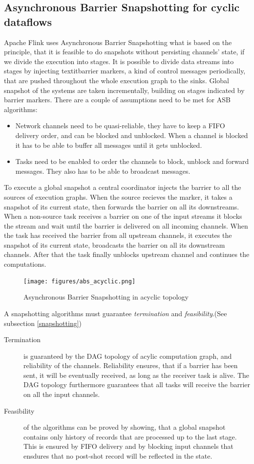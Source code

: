\subsection{Asynchronous Barrier Snapshotting for cyclic dataflows}
Apache Flink uses Asynchronous Barrier Snapshotting what is based on the principle, that it is feasible to do snapshots without persisting channels' state, if we divide the execution into stages. 
It is possible to divide data streams into stages by injecting textit{barrier markers}, a kind of control messages periodically, that are pushed throughout the whole execution graph to the sinks. Global snapshot of the systems are taken incrementally, building on stages indicated by barrier markers. There are a couple of assumptions need to be met for ASB algorithms:
\begin{itemize}
\item Network channels need to be quasi-reliable, they have to keep a FIFO delivery order, and can be blocked and unblocked. When a channel is blocked it has to be able to buffer all messages until it gets unblocked.
\item Tasks need to be enabled to order the channels to block, unblock and forward messages. They also has to be able to broadcast messages.
\end{itemize}
To execute a global snapshot a central coordinator injects the barrier to all the sources of execution graphs. When the source recieves the marker, it takes  a snapshot of its current state, then forwards the barrier on all its downstreams.  When a non-source task receives a barrier on one of the input streams it blocks the stream and wait until the barrier is delivered on all incoming channels. When the task has received the barrier from all upstream channels, it executes the snapshot of its current state, broadcasts the barrier on all its downstream channels. After that the task finally unblocks upstream channel and continues the computations.
\begin{figure}[!ht]
  \centering    
      \texttt{[image: figures/abs\_acyclic.png]}
  \caption{Asynchronous Barrier Snapshotting in acyclic topology\cite{abs}}
  \label{fig:abs_acyclic}
\end{figure}
A snapshotting algorithms must guarantee \textit{termination} and \textit{feasibility}.(See subsection \ref{snapshotting})
\begin{description}
\item[Termination] is guaranteed by the DAG topology of acylic computation graph, and reliability of the channels. Reliability ensures, that if a barrier has been sent, it will be eventually received, as long as the receiver task is alive. The DAG topology furthermore guarantees that all tasks will receive the barrier on all the input channels.
\item[Feasibility] of the algorithms can be proved by showing, that a global snapshot contains only history of records that are processed up to the last stage. This is ensured by FIFO delivery and by blocking input channels that ensdures that no post-shot record will be reflected in the state. 
\end{description}
